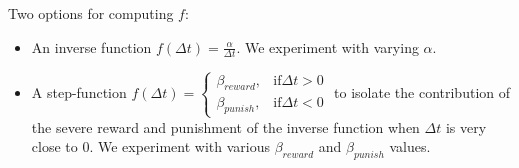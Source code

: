 \documentclass{article}
\begin{document}
Two options for computing $f$:\\
\begin{itemize}
    \item An inverse function $ f(\Delta t) = \frac{\alpha}{\Delta t} $. We experiment with varying $\alpha$.
    \item A step-function $ f(\Delta t) =\begin{cases}
		 \beta_{reward} , & \text{if} \Delta t > 0\\
         \beta_{punish} , & \text{if} \Delta t < 0
		 \end{cases} $ to isolate the contribution of the severe reward and punishment of the inverse function when $\Delta t$ is very close to 0. We experiment with various $\beta_{reward}$ and $\beta_{punish}$ values.
\end{itemize}

\end{document}
